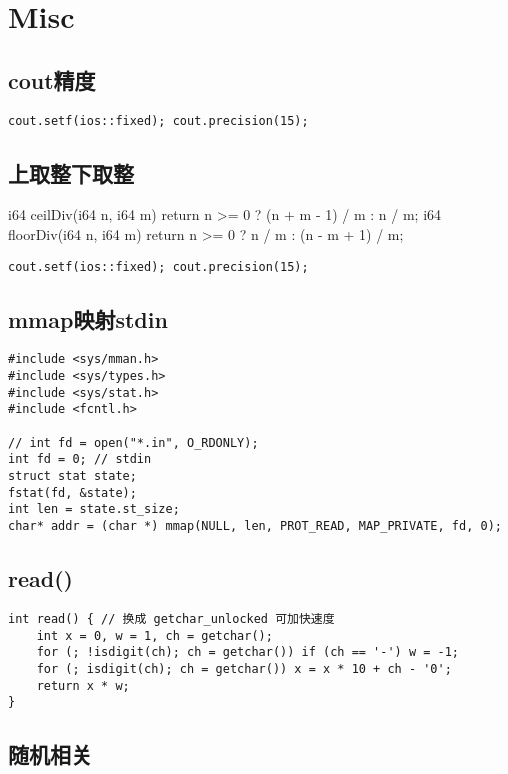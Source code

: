 \documentclass[a4paper,landscape,twocolumn]{ctexart}
\begin{document}
\section{Misc}

\subsection{cout精度}

\begin{lstlisting}
cout.setf(ios::fixed); cout.precision(15);
\end{lstlisting}

\subsection{上取整下取整}
i64 ceilDiv(i64 n, i64 m) {
	return n >= 0 ? (n + m - 1) / m : n / m;
}
i64 floorDiv(i64 n, i64 m) {
	return n >= 0 ? n / m : (n - m + 1) / m;
}
\begin{lstlisting}
cout.setf(ios::fixed); cout.precision(15);
\end{lstlisting}

\subsection{mmap映射stdin}

\begin{lstlisting}
#include <sys/mman.h>
#include <sys/types.h>
#include <sys/stat.h>
#include <fcntl.h>

// int fd = open("*.in", O_RDONLY);
int fd = 0; // stdin
struct stat state;
fstat(fd, &state);
int len = state.st_size;
char* addr = (char *) mmap(NULL, len, PROT_READ, MAP_PRIVATE, fd, 0);
\end{lstlisting}

\subsection{read()}

\begin{lstlisting}
int read() { // 换成 getchar_unlocked 可加快速度
	int x = 0, w = 1, ch = getchar();
	for (; !isdigit(ch); ch = getchar()) if (ch == '-') w = -1;
	for (; isdigit(ch); ch = getchar()) x = x * 10 + ch - '0';
	return x * w;
}
\end{lstlisting}

\subsection{随机相关}
\end{document}
